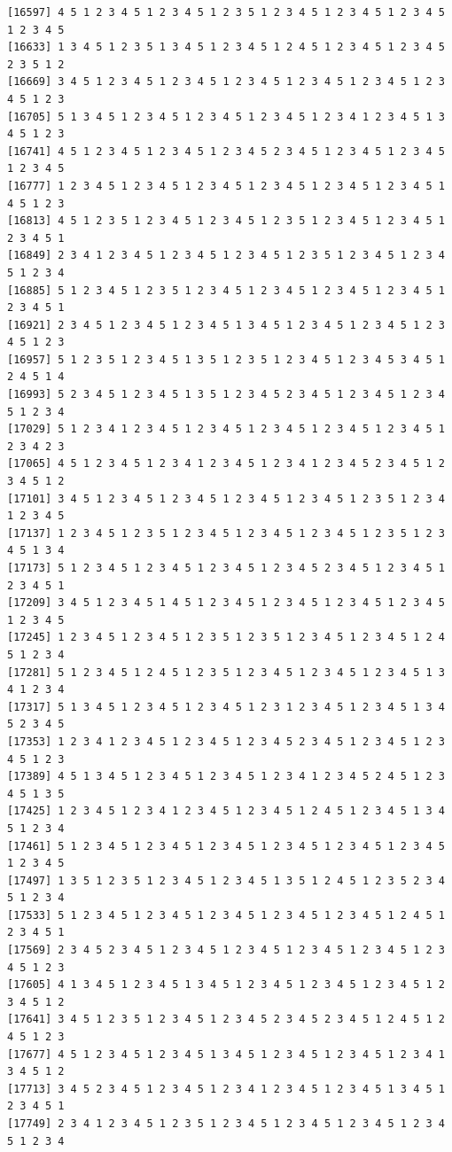 \documentclass[
  english,
]{book}
\begin{document}
\begin{verbatim}
[16597] 4 5 1 2 3 4 5 1 2 3 4 5 1 2 3 5 1 2 3 4 5 1 2 3 4 5 1 2 3 4 5 1 2 3 4 5
[16633] 1 3 4 5 1 2 3 5 1 3 4 5 1 2 3 4 5 1 2 4 5 1 2 3 4 5 1 2 3 4 5 2 3 5 1 2
[16669] 3 4 5 1 2 3 4 5 1 2 3 4 5 1 2 3 4 5 1 2 3 4 5 1 2 3 4 5 1 2 3 4 5 1 2 3
[16705] 5 1 3 4 5 1 2 3 4 5 1 2 3 4 5 1 2 3 4 5 1 2 3 4 1 2 3 4 5 1 3 4 5 1 2 3
[16741] 4 5 1 2 3 4 5 1 2 3 4 5 1 2 3 4 5 2 3 4 5 1 2 3 4 5 1 2 3 4 5 1 2 3 4 5
[16777] 1 2 3 4 5 1 2 3 4 5 1 2 3 4 5 1 2 3 4 5 1 2 3 4 5 1 2 3 4 5 1 4 5 1 2 3
[16813] 4 5 1 2 3 5 1 2 3 4 5 1 2 3 4 5 1 2 3 5 1 2 3 4 5 1 2 3 4 5 1 2 3 4 5 1
[16849] 2 3 4 1 2 3 4 5 1 2 3 4 5 1 2 3 4 5 1 2 3 5 1 2 3 4 5 1 2 3 4 5 1 2 3 4
[16885] 5 1 2 3 4 5 1 2 3 5 1 2 3 4 5 1 2 3 4 5 1 2 3 4 5 1 2 3 4 5 1 2 3 4 5 1
[16921] 2 3 4 5 1 2 3 4 5 1 2 3 4 5 1 3 4 5 1 2 3 4 5 1 2 3 4 5 1 2 3 4 5 1 2 3
[16957] 5 1 2 3 5 1 2 3 4 5 1 3 5 1 2 3 5 1 2 3 4 5 1 2 3 4 5 3 4 5 1 2 4 5 1 4
[16993] 5 2 3 4 5 1 2 3 4 5 1 3 5 1 2 3 4 5 2 3 4 5 1 2 3 4 5 1 2 3 4 5 1 2 3 4
[17029] 5 1 2 3 4 1 2 3 4 5 1 2 3 4 5 1 2 3 4 5 1 2 3 4 5 1 2 3 4 5 1 2 3 4 2 3
[17065] 4 5 1 2 3 4 5 1 2 3 4 1 2 3 4 5 1 2 3 4 1 2 3 4 5 2 3 4 5 1 2 3 4 5 1 2
[17101] 3 4 5 1 2 3 4 5 1 2 3 4 5 1 2 3 4 5 1 2 3 4 5 1 2 3 5 1 2 3 4 1 2 3 4 5
[17137] 1 2 3 4 5 1 2 3 5 1 2 3 4 5 1 2 3 4 5 1 2 3 4 5 1 2 3 5 1 2 3 4 5 1 3 4
[17173] 5 1 2 3 4 5 1 2 3 4 5 1 2 3 4 5 1 2 3 4 5 2 3 4 5 1 2 3 4 5 1 2 3 4 5 1
[17209] 3 4 5 1 2 3 4 5 1 4 5 1 2 3 4 5 1 2 3 4 5 1 2 3 4 5 1 2 3 4 5 1 2 3 4 5
[17245] 1 2 3 4 5 1 2 3 4 5 1 2 3 5 1 2 3 5 1 2 3 4 5 1 2 3 4 5 1 2 4 5 1 2 3 4
[17281] 5 1 2 3 4 5 1 2 4 5 1 2 3 5 1 2 3 4 5 1 2 3 4 5 1 2 3 4 5 1 3 4 1 2 3 4
[17317] 5 1 3 4 5 1 2 3 4 5 1 2 3 4 5 1 2 3 1 2 3 4 5 1 2 3 4 5 1 3 4 5 2 3 4 5
[17353] 1 2 3 4 1 2 3 4 5 1 2 3 4 5 1 2 3 4 5 2 3 4 5 1 2 3 4 5 1 2 3 4 5 1 2 3
[17389] 4 5 1 3 4 5 1 2 3 4 5 1 2 3 4 5 1 2 3 4 1 2 3 4 5 2 4 5 1 2 3 4 5 1 3 5
[17425] 1 2 3 4 5 1 2 3 4 1 2 3 4 5 1 2 3 4 5 1 2 4 5 1 2 3 4 5 1 3 4 5 1 2 3 4
[17461] 5 1 2 3 4 5 1 2 3 4 5 1 2 3 4 5 1 2 3 4 5 1 2 3 4 5 1 2 3 4 5 1 2 3 4 5
[17497] 1 3 5 1 2 3 5 1 2 3 4 5 1 2 3 4 5 1 3 5 1 2 4 5 1 2 3 5 2 3 4 5 1 2 3 4
[17533] 5 1 2 3 4 5 1 2 3 4 5 1 2 3 4 5 1 2 3 4 5 1 2 3 4 5 1 2 4 5 1 2 3 4 5 1
[17569] 2 3 4 5 2 3 4 5 1 2 3 4 5 1 2 3 4 5 1 2 3 4 5 1 2 3 4 5 1 2 3 4 5 1 2 3
[17605] 4 1 3 4 5 1 2 3 4 5 1 3 4 5 1 2 3 4 5 1 2 3 4 5 1 2 3 4 5 1 2 3 4 5 1 2
[17641] 3 4 5 1 2 3 5 1 2 3 4 5 1 2 3 4 5 2 3 4 5 2 3 4 5 1 2 4 5 1 2 4 5 1 2 3
[17677] 4 5 1 2 3 4 5 1 2 3 4 5 1 3 4 5 1 2 3 4 5 1 2 3 4 5 1 2 3 4 1 3 4 5 1 2
[17713] 3 4 5 2 3 4 5 1 2 3 4 5 1 2 3 4 1 2 3 4 5 1 2 3 4 5 1 3 4 5 1 2 3 4 5 1
[17749] 2 3 4 1 2 3 4 5 1 2 3 5 1 2 3 4 5 1 2 3 4 5 1 2 3 4 5 1 2 3 4 5 1 2 3 4

\end{verbatim}
\end{document}
